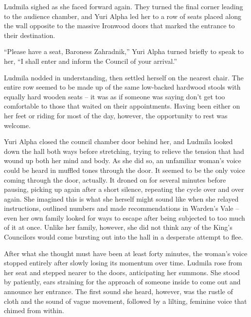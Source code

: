  

Ludmila sighed as she faced forward again. They turned the final corner leading to the audience chamber, and Yuri Alpha led her to a row of seats placed along the wall opposite to the massive Ironwood doors that marked the entrance to their destination.

 

“Please have a seat, Baroness Zahradnik,” Yuri Alpha turned briefly to speak to her, “I shall enter and inform the Council of your arrival.”

 

Ludmila nodded in understanding, then settled herself on the nearest chair. The entire row seemed to be made up of the same low-backed hardwood stools with equally hard wooden seats – it was as if someone was saying don’t get too comfortable to those that waited on their appointments. Having been either on her feet or riding for most of the day, however, the opportunity to rest was welcome.

 

Yuri Alpha closed the council chamber door behind her, and Ludmila looked down the hall both ways before stretching, trying to relieve the tension that had wound up both her mind and body. As she did so, an unfamiliar woman’s voice could be heard in muffled tones through the door. It seemed to be the only voice coming through the door, actually. It droned on for several minutes before pausing, picking up again after a short silence, repeating the cycle over and over again. She imagined this is what she herself might sound like when she relayed instructions, outlined numbers and made recommendations in Warden’s Vale – even her own family looked for ways to escape after being subjected to too much of it at once. Unlike her family, however, she did not think any of the King’s Councilors would come bursting out into the hall in a desperate attempt to flee.

 

After what she thought must have been at least forty minutes, the woman’s voice stopped entirely after slowly losing its momentum over time. Ludmila rose from her seat and stepped nearer to the doors, anticipating her summons. She stood by patiently, ears straining for the approach of someone inside to come out and announce her entrance. The first sound she heard, however, was the rustle of cloth and the sound of vague movement, followed by a lilting, feminine voice that chimed from within.

 

